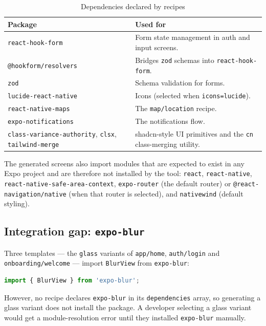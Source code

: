 \begin{longtable}{p{5.4cm}p{8.8cm}}
\caption{Dependencies declared by recipes}\\
\toprule
\textbf{Package} & \textbf{Used for} \\
\midrule

\texttt{react-hook-form} & Form state management in auth and input screens. \\
\texttt{@hookform/resolvers} & Bridges \texttt{zod} schemas into
\texttt{react-hook-form}. \\
\texttt{zod} & Schema validation for forms. \\
\texttt{lucide-react-native} & Icons (selected when \texttt{icons=lucide}). \\
\texttt{react-native-maps} & The \texttt{map/location} recipe. \\
\texttt{expo-notifications} & The notifications flow. \\
\texttt{class-variance-authority}, \texttt{clsx}, \texttt{tailwind-merge} &
shadcn-style UI primitives and the \texttt{cn} class-merging utility. \\
\bottomrule
\end{longtable}

The generated screens also import modules that are expected to exist in any Expo
project and are therefore not installed by the tool: \texttt{react},
\texttt{react-native}, \texttt{react-native-safe-area-context},
\texttt{expo-router} (the default router) or \texttt{@react-navigation/native}
(when that router is selected), and \texttt{nativewind} (default styling).

\subsection*{Integration gap: \texttt{expo-blur}}

Three templates --- the \texttt{glass} variants of \texttt{app/home},
\texttt{auth/login} and \texttt{onboarding/welcome} --- import
\texttt{BlurView} from \texttt{expo-blur}:

\begin{lstlisting}[language=JavaScript]
import { BlurView } from 'expo-blur';
\end{lstlisting}

However, no recipe declares \texttt{expo-blur} in its \texttt{dependencies}
array, so generating a glass variant does not install the package. A developer
selecting a glass variant would get a module-resolution error until they
installed \texttt{expo-blur} manually.

